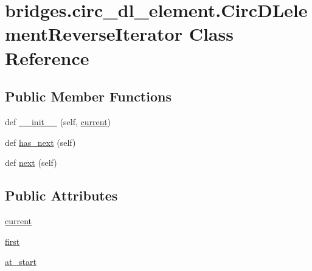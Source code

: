 \hypertarget{classbridges_1_1circ__dl__element_1_1_circ_d_lelement_reverse_iterator}{}\section{bridges.\+circ\+\_\+dl\+\_\+element.\+Circ\+D\+Lelement\+Reverse\+Iterator Class Reference}
\label{classbridges_1_1circ__dl__element_1_1_circ_d_lelement_reverse_iterator}
\subsection*{Public Member Functions}
\begin{DoxyCompactItemize}
\item 
def \hyperlink{classbridges_1_1circ__dl__element_1_1_circ_d_lelement_reverse_iterator_a128778e5f4c1027815ee36b624c7c6df}{\+\_\+\+\_\+init\+\_\+\+\_\+} (self, \hyperlink{classbridges_1_1circ__dl__element_1_1_circ_d_lelement_reverse_iterator_a098c10ac708476a487a70e8d61740ea6}{current})
\item 
def \hyperlink{classbridges_1_1circ__dl__element_1_1_circ_d_lelement_reverse_iterator_a551a3963bdf4122cbef1457413d49813}{has\+\_\+next} (self)
\item 
def \hyperlink{classbridges_1_1circ__dl__element_1_1_circ_d_lelement_reverse_iterator_a174ddeba3a0a5b7909d5c306c697e477}{next} (self)
\end{DoxyCompactItemize}
\subsection*{Public Attributes}
\begin{DoxyCompactItemize}
\item 
\hyperlink{classbridges_1_1circ__dl__element_1_1_circ_d_lelement_reverse_iterator_a098c10ac708476a487a70e8d61740ea6}{current}
\item 
\hyperlink{classbridges_1_1circ__dl__element_1_1_circ_d_lelement_reverse_iterator_a6e85b7558acd1eafd564f19e7c269adb}{first}
\item 
\hyperlink{classbridges_1_1circ__dl__element_1_1_circ_d_lelement_reverse_iterator_acdd7ca795117be3868d41210fe394f1f}{at\+\_\+start}
\end{DoxyCompactItemize}


